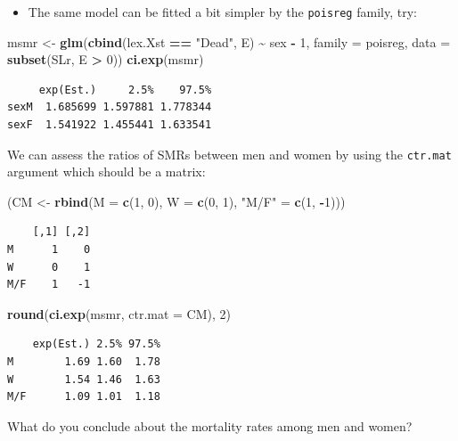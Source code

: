 \documentclass[
]{book}
\newenvironment{Shaded}{\begin{snugshade}}{\end{snugshade}}
\newcommand{\AttributeTok}[1]{\textcolor[rgb]{0.13,0.29,0.53}{#1}}
\newcommand{\DecValTok}[1]{\textcolor[rgb]{0.00,0.00,0.81}{#1}}
\newcommand{\FunctionTok}[1]{\textcolor[rgb]{0.13,0.29,0.53}{\textbf{#1}}}
\newcommand{\NormalTok}[1]{#1}
\newcommand{\OtherTok}[1]{\textcolor[rgb]{0.56,0.35,0.01}{#1}}
\newcommand{\SpecialCharTok}[1]{\textcolor[rgb]{0.81,0.36,0.00}{\textbf{#1}}}
\newcommand{\StringTok}[1]{\textcolor[rgb]{0.31,0.60,0.02}{#1}}
\providecommand{\tightlist}{%
  \setlength{\itemsep}{0pt}\setlength{\parskip}{0pt}}
\begin{document}
\begin{enumerate}
  \begin{itemize}
  \tightlist
  \item
    The same model can be fitted a bit simpler by the \texttt{poisreg} family, try:
  \end{itemize}

\begin{Shaded}
\begin{Highlighting}[]
\NormalTok{msmr }\OtherTok{\textless{}{-}} \FunctionTok{glm}\NormalTok{(}\FunctionTok{cbind}\NormalTok{(lex.Xst }\SpecialCharTok{==} \StringTok{"Dead"}\NormalTok{, E) }\SpecialCharTok{\textasciitilde{}}\NormalTok{ sex }\SpecialCharTok{{-}} \DecValTok{1}\NormalTok{, }
            \AttributeTok{family =}\NormalTok{ poisreg,}
              \AttributeTok{data =} \FunctionTok{subset}\NormalTok{(SLr, E }\SpecialCharTok{\textgreater{}} \DecValTok{0}\NormalTok{))}
\FunctionTok{ci.exp}\NormalTok{(msmr)}
\end{Highlighting}
\end{Shaded}

\begin{verbatim}
     exp(Est.)     2.5%    97.5%
sexM  1.685699 1.597881 1.778344
sexF  1.541922 1.455441 1.633541
\end{verbatim}

  We can assess the ratios of SMRs between men and women by using the
  \texttt{ctr.mat} argument which should be a matrix:

\begin{Shaded}
\begin{Highlighting}[]
\NormalTok{(CM }\OtherTok{\textless{}{-}} \FunctionTok{rbind}\NormalTok{(}\AttributeTok{M =} \FunctionTok{c}\NormalTok{(}\DecValTok{1}\NormalTok{, }\DecValTok{0}\NormalTok{),}
             \AttributeTok{W =} \FunctionTok{c}\NormalTok{(}\DecValTok{0}\NormalTok{, }\DecValTok{1}\NormalTok{),}
         \StringTok{"M/F"} \OtherTok{=} \FunctionTok{c}\NormalTok{(}\DecValTok{1}\NormalTok{, }\SpecialCharTok{{-}}\DecValTok{1}\NormalTok{)))}
\end{Highlighting}
\end{Shaded}

\begin{verbatim}
    [,1] [,2]
M      1    0
W      0    1
M/F    1   -1
\end{verbatim}

\begin{Shaded}
\begin{Highlighting}[]
\FunctionTok{round}\NormalTok{(}\FunctionTok{ci.exp}\NormalTok{(msmr, }\AttributeTok{ctr.mat =}\NormalTok{ CM), }\DecValTok{2}\NormalTok{)}
\end{Highlighting}
\end{Shaded}

\begin{verbatim}
    exp(Est.) 2.5% 97.5%
M        1.69 1.60  1.78
W        1.54 1.46  1.63
M/F      1.09 1.01  1.18
\end{verbatim}

  What do you conclude about the mortality rates among men and women?
\end{enumerate}
\end{document}
